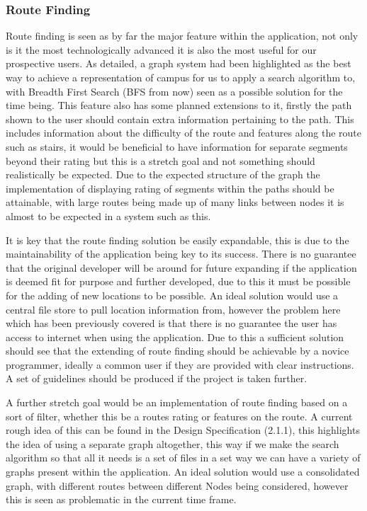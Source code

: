\subsubsection{Route Finding}
Route finding is seen as by far the major feature within the application, not only is it the most technologically advanced it is also the most useful for our prospective users. As detailed, a graph system had been highlighted as the best way to achieve a representation of campus for us to apply a search algorithm to, with Breadth First Search (BFS from now)\cite{bfs} seen as a possible solution for the time being. This feature also has some planned extensions to it, firstly the path shown to the user should contain extra information pertaining to the path. This includes information about the difficulty of the route and features along the route such as stairs, it would be beneficial to have information for separate segments beyond their rating but this is a stretch goal and not something should realistically be expected. Due to the expected structure of the graph the implementation of displaying rating of segments within the paths should be attainable, with large routes being made up of many links between nodes it is almost to be expected in a system such as this. 

It is key that the route finding solution be easily expandable, this is due to the maintainability of the application being key to its success. There is no guarantee that the original developer will be around for future expanding if the application is deemed fit for purpose and further developed, due to this it must be possible for the adding of new locations to be possible. An ideal solution would use a central file store to pull location information from, however the problem here which has been previously covered is that there is no guarantee the user has access to internet when using the application. Due to this a sufficient solution should see that the extending of route finding should be achievable by a novice programmer, ideally a common user if they are provided with clear instructions. A set of guidelines should be produced if the project is taken further. 

A further stretch goal would be an implementation of route finding based on a sort of filter, whether this be a routes rating or features on the route. A current rough idea of this can be found in the Design Specification (2.1.1), this highlights the idea of using a separate graph altogether, this way if we make the search algorithm so that all it needs is a set of files in a set way we can have a variety of graphs present within the application. An ideal solution would use a consolidated graph, with different routes between different Nodes being considered, however this is seen as problematic in the current time frame. 

